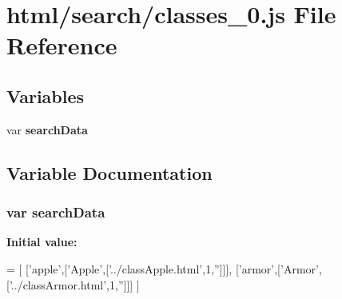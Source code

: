 \section{html/search/classes\-\_\-0.js File Reference}
\label{classes__0_8js}
\subsection*{Variables}
\begin{DoxyCompactItemize}
\item 
var {\bf search\-Data}
\end{DoxyCompactItemize}


\subsection{Variable Documentation}
\subsubsection[{search\-Data}]{\setlength{\rightskip}{0pt plus 5cm}var search\-Data}\label{classes__0_8js_ad01a7523f103d6242ef9b0451861231e}
{\bfseries Initial value\-:}
\begin{DoxyCode}
=
[
  [\textcolor{stringliteral}{'apple'},[\textcolor{stringliteral}{'Apple'},[\textcolor{stringliteral}{'../classApple.html'},1,\textcolor{stringliteral}{''}]]],
  [\textcolor{stringliteral}{'armor'},[\textcolor{stringliteral}{'Armor'},[\textcolor{stringliteral}{'../classArmor.html'},1,\textcolor{stringliteral}{''}]]]
]
\end{DoxyCode}
